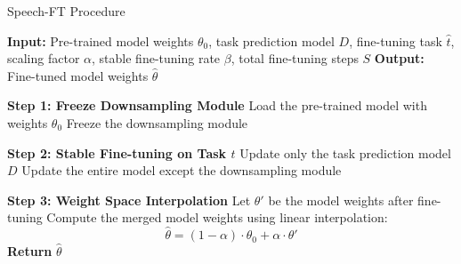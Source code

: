 \begin{algorithm}
    \caption{Speech-FT Procedure}
    \label{alg:speech-ft}
    \begin{algorithmic}[1]
        \STATE \textbf{Input:} Pre-trained model weights $\theta_0$, task prediction model $D$, fine-tuning task $\hat{t}$, scaling factor $\alpha$, stable fine-tuning rate $\beta$, total fine-tuning steps $S$
        \STATE \textbf{Output:} Fine-tuned model weights $\hat{\theta}$

        \STATE \textbf{Step 1: Freeze Downsampling Module}
        \STATE Load the pre-trained model with weights $\theta_0$
        \STATE Freeze the downsampling module

        \STATE \textbf{Step 2: Stable Fine-tuning on Task $\hat{t}$}
                \STATE Update only the task prediction model $D$
            \ELSE
                \STATE Update the entire model except the downsampling module
            \ENDIF
        \ENDFOR

        \STATE \textbf{Step 3: Weight Space Interpolation}
        \STATE Let $\theta'$ be the model weights after fine-tuning
        \STATE Compute the merged model weights using linear interpolation:
        \[
            \hat{\theta} = (1 - \alpha) \cdot \theta_0 + \alpha \cdot \theta'
        \]
        \vspace{-2em}
        \STATE \textbf{Return} $\hat{\theta}$
        
    \end{algorithmic}
\end{algorithm}
